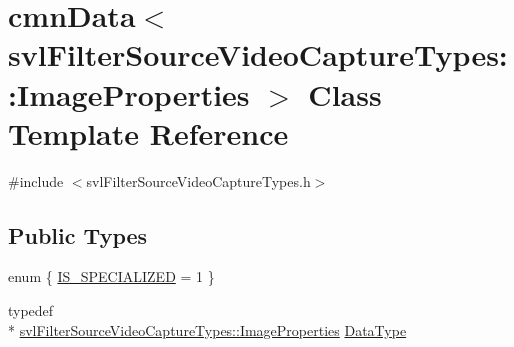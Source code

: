 \hypertarget{classcmn_data_3_01svl_filter_source_video_capture_types_1_1_image_properties_01_4}{\section{cmn\-Data$<$ svl\-Filter\-Source\-Video\-Capture\-Types\-:\-:Image\-Properties $>$ Class Template Reference}
\label{classcmn_data_3_01svl_filter_source_video_capture_types_1_1_image_properties_01_4}
}


{\ttfamily \#include $<$svl\-Filter\-Source\-Video\-Capture\-Types.\-h$>$}

\subsection*{Public Types}
\begin{DoxyCompactItemize}
\item 
enum \{ \hyperlink{classcmn_data_3_01svl_filter_source_video_capture_types_1_1_image_properties_01_4_a08ae77ffd1f342f19e1acc7e38ca6cb7a70e556b7255e5604e78fbc82545e271b}{I\-S\-\_\-\-S\-P\-E\-C\-I\-A\-L\-I\-Z\-E\-D} = 1
 \}
\item 
typedef \\*
\hyperlink{classsvl_filter_source_video_capture_types_1_1_image_properties}{svl\-Filter\-Source\-Video\-Capture\-Types\-::\-Image\-Properties} \hyperlink{classcmn_data_3_01svl_filter_source_video_capture_types_1_1_image_properties_01_4_a5e4f9ec9d3c7fa6c707332abbc73cf39}{Data\-Type}
\end{DoxyCompactItemize}
